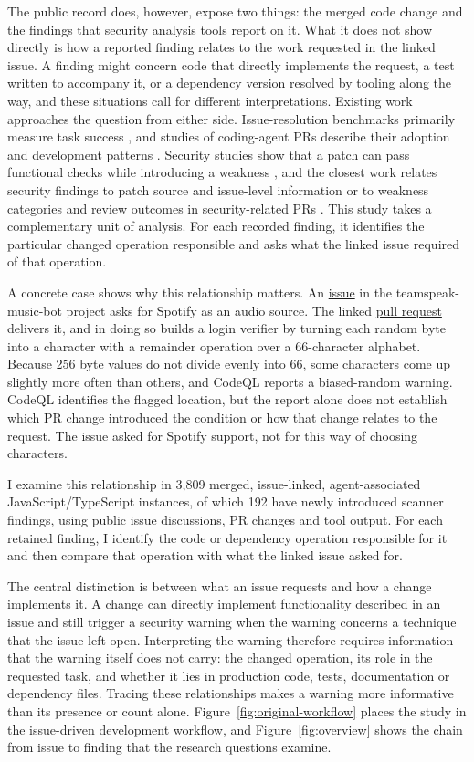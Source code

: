 \documentclass[acmsmall,screen,nonacm]{acmart}
\begin{document}
The public record does, however, expose two things: the merged code change and the findings that security analysis tools report on it. What it does not show directly is how a reported finding relates to the work requested in the linked issue. A finding might concern code that directly implements the request, a test written to accompany it, or a dependency version resolved by tooling along the way, and these situations call for different interpretations. Existing work approaches the question from either side. Issue-resolution benchmarks primarily measure task success \cite{b9}, and studies of coding-agent PRs describe their adoption and development patterns \cite{b11,b21}. Security studies show that a patch can pass functional checks while introducing a weakness \cite{b3,b35}, and the closest work relates security findings to patch source and issue-level information \cite{b48} or to weakness categories and review outcomes in security-related PRs \cite{b49}. This study takes a complementary unit of analysis. For each recorded finding, it identifies the particular changed operation responsible and asks what the linked issue required of that operation.

A concrete case shows why this relationship matters. An \href{https://github.com/ZHANGTIANYAO1/teamspeak-music-bot/issues/112}{issue} in the teamspeak-music-bot project asks for Spotify as an audio source. The linked \href{https://github.com/ZHANGTIANYAO1/teamspeak-music-bot/pull/118}{pull request} delivers it, and in doing so builds a login verifier by turning each random byte into a character with a remainder operation over a 66-character alphabet. Because 256 byte values do not divide evenly into 66, some characters come up slightly more often than others, and CodeQL reports a biased-random warning. CodeQL identifies the flagged location, but the report alone does not establish which PR change introduced the condition or how that change relates to the request. The issue asked for Spotify support, not for this way of choosing characters.

I examine this relationship in 3,809 merged, issue-linked, agent-associated JavaScript/\allowbreak TypeScript instances, of which 192 have newly introduced scanner findings, using public issue discussions, PR changes and tool output. For each retained finding, I identify the code or dependency operation responsible for it and then compare that operation with what the linked issue asked for.

The central distinction is between what an issue requests and how a change implements it. A change can directly implement functionality described in an issue and still trigger a security warning when the warning concerns a technique that the issue left open. Interpreting the warning therefore requires information that the warning itself does not carry: the changed operation, its role in the requested task, and whether it lies in production code, tests, documentation or dependency files. Tracing these relationships makes a warning more informative than its presence or count alone. Figure~\ref{fig:original-workflow} places the study in the issue-driven development workflow, and Figure~\ref{fig:overview} shows the chain from issue to finding that the research questions examine.
\end{document}
